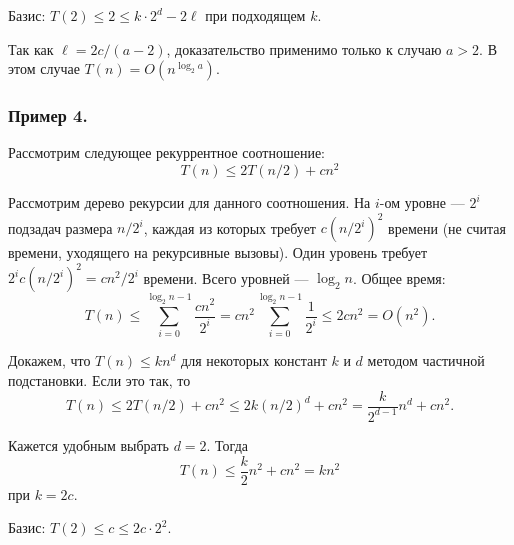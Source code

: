 \documentclass[a4paper,12pt]{article}
\begin{document}
Базис: $T(2) \leq 2 \leq k \cdot 2^d - 2\ell$ при подходящем $k$.

Так как $\ell = 2c / (a - 2)$, доказательство применимо только к случаю $a > 2$. В этом случае $T(n) = O(n^{\log_2a})$.

\subsubsection{Пример 4.}
Рассмотрим следующее рекуррентное соотношение:
\[T(n) \leq 2T(n/2) + cn^2\]

Рассмотрим дерево рекурсии для данного соотношения. На $i$-ом уровне --- $2^i$ подзадач размера $n / 2^i$, каждая из которых требует $c(n/2^i)^2$ времени (не считая времени, уходящего на рекурсивные вызовы). Один уровень требует $2^ic(n / 2^i)^2 = cn^2 / 2^i$ времени. Всего уровней --- $\log_2 n$. Общее время:
\[T(n) \leq \sum_{i=0}^{\log_2n - 1}\frac{cn^2}{2^i} = cn^2\sum_{i=0}^{\log_2n - 1}\frac{1}{2^i} \leq 2cn^2 = O(n^2).\]

Докажем, что $T(n) \leq kn^d$ для некоторых констант $k$ и $d$ методом частичной подстановки. Если это так, то
\[T(n) \leq 2T(n/2) + cn^2 \leq 2k(n/2)^d + cn^2 = \frac{k}{2^{d-1}}n^d + cn^2.\]

Кажется удобным выбрать $d = 2$. Тогда
\[T(n) \leq \frac{k}{2}n^2 + cn^2 = kn^2\]
при $k = 2c$.

Базис: $T(2) \leq c \leq 2c \cdot 2^2$.
\end{document}
